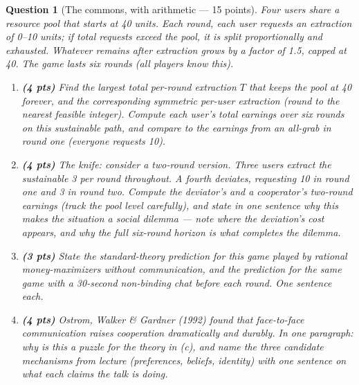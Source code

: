\documentclass[11pt]{article}
\newtheorem{question}{Question}
\begin{document}
\begin{question}[The commons, with arithmetic --- 15 points]
Four users share a resource pool that starts at 40 units. Each round,
each user requests an extraction of 0--10 units; if total requests
exceed the pool, it is split proportionally and exhausted. Whatever
remains after extraction grows by a factor of 1.5, capped at 40. The
game lasts six rounds (all players know this).

\begin{enumerate}[label=(\alph*)]
  \item \textbf{(4 pts)} Find the largest total per-round extraction
        $T$ that keeps the pool at 40 forever, and the corresponding
        symmetric per-user extraction (round to the nearest feasible
        integer). Compute each user's total earnings over six rounds on
        this sustainable path, and compare to the earnings from an
        all-grab in round one (everyone requests 10).
  \item \textbf{(4 pts)} The knife: consider a two-round version.
        Three users extract the sustainable 3 per round throughout. A
        fourth deviates, requesting 10 in round one and 3 in round two.
        Compute the deviator's and a cooperator's two-round earnings
        (track the pool level carefully), and state in one sentence why
        this makes the situation a social dilemma --- note where the
        deviation's cost appears, and why the full six-round horizon is
        what completes the dilemma.
  \item \textbf{(3 pts)} State the standard-theory prediction for this
        game played by rational money-maximizers without communication,
        and the prediction for the same game with a 30-second
        non-binding chat before each round. One sentence each.
  \item \textbf{(4 pts)} Ostrom, Walker \& Gardner (1992) found that
        face-to-face communication raises cooperation dramatically and
        durably. In one paragraph: why is this a puzzle for the theory
        in (c), and name the three candidate mechanisms from lecture
        (preferences, beliefs, identity) with one sentence on what each
        claims the talk is doing.
\end{enumerate}
\end{question}
\end{document}
